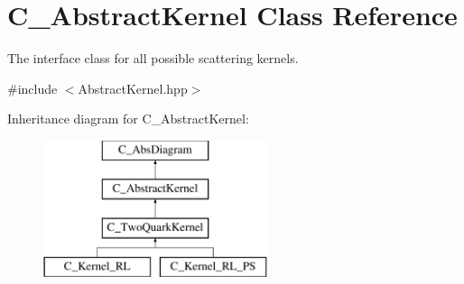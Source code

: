\hypertarget{class_c___abstract_kernel}{\section{C\-\_\-\-Abstract\-Kernel Class Reference}
\label{class_c___abstract_kernel}
}


The interface class for all possible scattering kernels.  




{\ttfamily \#include $<$Abstract\-Kernel.\-hpp$>$}

Inheritance diagram for C\-\_\-\-Abstract\-Kernel\-:\begin{figure}[H]
\begin{center}
\leavevmode
\includegraphics[height=4.000000cm]{class_c___abstract_kernel}
\end{center}
\end{figure}
